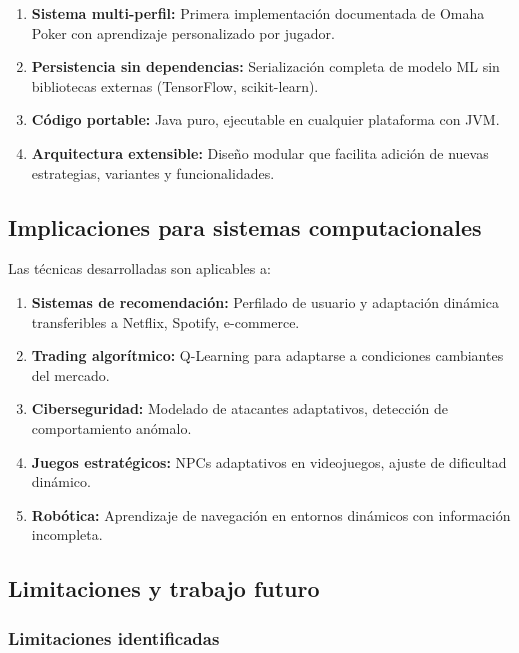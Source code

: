 \documentclass[12pt,a4paper]{article}
\begin{document}
\begin{enumerate}
    \item \textbf{Sistema multi-perfil:} Primera implementación documentada de Omaha Poker con aprendizaje personalizado por jugador.
    
    \item \textbf{Persistencia sin dependencias:} Serialización completa de modelo ML sin bibliotecas externas (TensorFlow, scikit-learn).
    \item \textbf{Código portable:} Java puro, ejecutable en cualquier plataforma con JVM.
    
    \item \textbf{Arquitectura extensible:} Diseño modular que facilita adición de nuevas estrategias, variantes y funcionalidades.
\end{enumerate}

\subsection{Implicaciones para sistemas computacionales}

Las técnicas desarrolladas son aplicables a:

\begin{enumerate}
    \item \textbf{Sistemas de recomendación:} Perfilado de usuario y adaptación dinámica transferibles a Netflix, Spotify, e-commerce.
    
    \item \textbf{Trading algorítmico:} Q-Learning para adaptarse a condiciones cambiantes del mercado.
    
    \item \textbf{Ciberseguridad:} Modelado de atacantes adaptativos, detección de comportamiento anómalo.
    
    \item \textbf{Juegos estratégicos:} NPCs adaptativos en videojuegos, ajuste de dificultad dinámico.
    
    \item \textbf{Robótica:} Aprendizaje de navegación en entornos dinámicos con información incompleta.
\end{enumerate}

\subsection{Limitaciones y trabajo futuro}

\subsubsection{Limitaciones identificadas}
\end{document}
